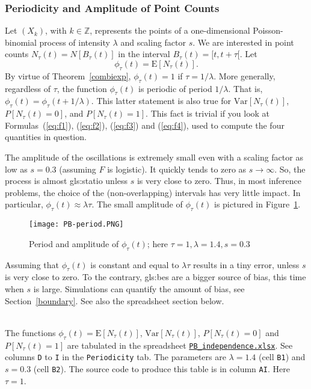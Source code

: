 \documentclass[10pt]{article}
\begin{document}
\subsubsection{Periodicity and Amplitude of Point Counts}\label{bbei}

Let  $(X_k)$, with $k\in\mathbb{Z}$, represents the points of a one-dimensional Poisson-binomial process of intensity $\lambda$ and scaling factor $s$. We are interested in point counts 
$N_\tau(t)=N[B_\tau(t)]$ in  the interval $B_\tau(t)=[t, t+\tau[$. Let
 $$\phi_\tau(t) = \mbox{E}[N_\tau(t)].$$ 
By virtue of 
Theorem~\ref{combiexp}, $\phi_\tau(t)=1$ if $\tau=1/\lambda$. More generally, regardless of $\tau$, the function $\phi_\tau(t)$ is periodic of
period $1/\lambda$. That is, $\phi_\tau(t)=\phi_\tau(t+1/\lambda)$. This latter statement is also true 
for $\mbox{Var}[N_\tau(t)]$, $P[N_\tau(t)=0]$, and $P[N_\tau(t)=1]$. This fact is trivial if you look at Formulas~(\ref{eq:f1}), (\ref{eq:f2}), (\ref{eq:f3}) and (\ref{eq:f4}),
 used to compute the four quantities in question.

The amplitude of the oscillations is extremely small even with a scaling factor as low as $s=0.3$ (assuming $F$ is logistic). It quickly tends to zero as $s\rightarrow\infty$. So, 
the process is almost \gls{gls:statio} unless $s$ is very close to zero. Thus, in most inference problems, the choice of the (non-overlapping) intervals has very little impact. In particular, $\phi_\tau(t)\approx \lambda\tau$. The small amplitude of $\phi_\tau(t)$ is pictured in Figure~\ref{fig:pbperiod}.

\begin{figure}[H]
\centering
\texttt{[image: PB-period.PNG]}
\caption{Period and amplitude of $\phi_\tau(t)$; here $\tau=1,\lambda=1.4, s=0.3$}
\label{fig:pbperiod}
\end{figure}

Assuming that $\phi_\tau(t)$ is constant and equal to $\lambda\tau$ results in a tiny error, unless $s$ is very close to zero. To the contrary, 
\glspl{gls:be} are a bigger source of bias, this time when $s$ is large. Simulations can quantify the amount of bias, see Section~\ref{boundary}. See also
the spreadsheet section below.\\
\quad \\

\noindent The functions $\phi_\tau(t)=\mbox{E}[N_\tau(t)]$, $\mbox{Var}[N_\tau(t)]$, $P[N_\tau(t)=0]$ and $P[N_\tau(t)=1]$ are tabulated in the spreadsheet 
 \href{https://github.com/VincentGranville/Point-Processes/tree/main/Spreadsheets}{\texttt{PB\_independence.xlsx}}. See columns \texttt{D} to \texttt{I} in the \texttt{Periodicity} tab.  
The parameters are $\lambda=1.4$ (cell \texttt{B1}) and $s=0.3$ (cell \texttt{B2}). The source code to produce this table is in column \texttt{AI}. Here $\tau=1$.
\end{document}
